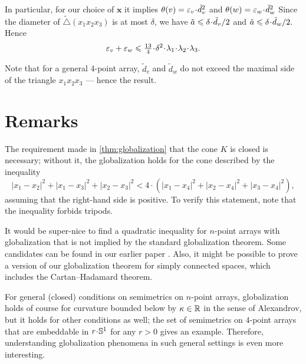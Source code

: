 \documentclass[a4paper,10pt]{article}
\begin{document}
In particular, for our choice of $\bm{x}$ it implies $\theta(v)=\eps_v\cdot \tilde d_v^2$ and $\theta(w)=\eps_w\cdot \tilde d_w^2$
Since the diameter of $\tilde\triangle(x_1x_2x_3)$ is at most $\delta$, we have
$\tilde a\z\le \delta\cdot \tilde d_v/2$ and
$\tilde a\z\le \delta\cdot \tilde d_w/2$.
Hence
\[\eps_v+\eps_w\le \tfrac{13}4\cdot \delta^2\cdot\lambda_1\cdot\lambda_2\cdot\lambda_3.\]

Note that for a general 4-point array, $\tilde d_v$ and $\tilde d_w$ do not exceed the maximal side of the triangle $x_1x_2x_3$ --- hence the result.
\qeds

\section{Remarks}

The requirement made in \ref{thm:globalization} that the cone $K$ is closed is necessary;
without it, the globalization holds for the cone described by the inequality
\[|x_1-x_2|^2+|x_1-x_3|^2+|x_2-x_3|^2<4\cdot(|x_1-x_4|^2+|x_2-x_4|^2+|x_3-x_4|^2),\]
assuming that the right-hand side is positive.
To verify this statement, note that the inequality forbids tripods.

It would be super-nice to find a quadratic inequality for $n$-point arrays with globalization that is not implied by the standard globalization theorem.
Some candidates can be found in our earlier paper \cite{lebedeva-petrunin-zolotov}.
Also, it might be possible to prove a version of our globalization theorem
for simply connected spaces, which includes the Cartan--Hadamard theorem.

For general (closed) conditions on semimetrics on $n$-point arrays, globalization holds of course for curvature bounded below by $\kappa\in \mathbb{R}$ in the sense of Alexandrov,
but it holds for other conditions as well;
the set of semimetrics on $4$-point arrays that are embeddable in $r\cdot\SSS^1$ for any $r>0$ gives an example.
Therefore, understanding globalization phenomena in such general settings is even more interesting.

{\sloppy
\def\emph{\textit}
\printbibliography[heading=bibintoc]
\fussy
}
\end{document}

